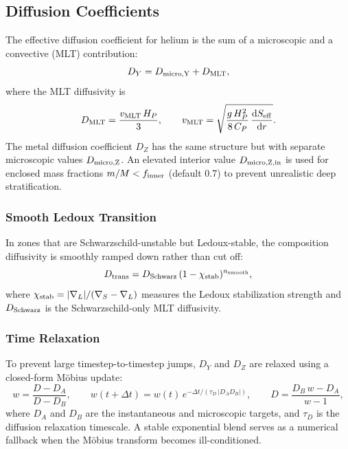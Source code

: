 \documentclass{aastex631}
\newcommand{\dd}{\mathrm{d}}
\newcommand{\Hp}{H_P}
\newcommand{\Hpress}{H_P}
\newcommand{\Cp}{C_P}
\begin{document}
\subsection{Diffusion Coefficients}\label{sec:comp_diff}

The effective diffusion coefficient for helium is the sum of a
microscopic and a convective (MLT) contribution:
\begin{equation}\label{eq:DY}
  D_Y = D_{\rm micro,Y} + D_{\rm MLT},
\end{equation}
where the MLT diffusivity is
\begin{equation}\label{eq:DMLT}
  D_{\rm MLT}
  = \frac{v_{\rm MLT}\,\Hpress}{3},
  \qquad
  v_{\rm MLT}
  = \sqrt{\frac{g\,\Hp^2}{8\,\Cp}\,\frac{\dd S_{\rm eff}}{\dd r}}.
\end{equation}
The metal diffusion coefficient $D_Z$ has the same structure but with
separate microscopic values $D_{\rm micro,Z}$.  An elevated interior
value $D_{\rm micro,Z,in}$ is used for enclosed mass fractions
$m/M < f_{\rm inner}$ (default 0.7) to prevent unrealistic deep
stratification.

\subsubsection{Smooth Ledoux Transition}

In zones that are Schwarzschild-unstable but Ledoux-stable, the
composition diffusivity is smoothly ramped down rather than cut off:
\begin{equation}
  D_{\rm trans}
  = D_{\rm Schwarz}\,(1 - \chi_{\rm stab})^{n_{\rm smooth}},
\end{equation}
where $\chi_{\rm stab}=|\nabla_L|/(\nabla_S - \nabla_L)$ measures
the Ledoux stabilization strength and $D_{\rm Schwarz}$ is the
Schwarzschild-only MLT diffusivity.

\subsubsection{Time Relaxation}

To prevent large timestep-to-timestep jumps, $D_Y$ and $D_Z$ are relaxed
using a closed-form M\"obius update:
\begin{equation}\label{eq:D_relax}
  w = \frac{D - D_A}{D - D_B},
  \qquad
  w(t+\Delta t) = w(t)\,e^{-\Delta t/(\tau_D\,|D_A D_B|)},
  \qquad
  D = \frac{D_B\,w - D_A}{w - 1},
\end{equation}
where $D_A$ and $D_B$ are the instantaneous and microscopic targets, and
$\tau_D$ is the diffusion relaxation timescale.  A stable exponential
blend serves as a numerical fallback when the M\"obius transform becomes
ill-conditioned.
\end{document}
